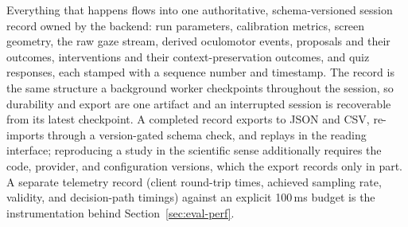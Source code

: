 Everything that happens flows into one authoritative, schema-versioned session record owned by the backend: run parameters, calibration metrics, screen geometry, the raw gaze stream, derived oculomotor events, proposals and their outcomes, interventions and their context-preservation outcomes, and quiz responses, each stamped with a sequence number and timestamp.
The record is the same structure a background worker checkpoints throughout the session, so durability and export are one artifact and an interrupted session is recoverable from its latest checkpoint.
A completed record exports to JSON and CSV, re-imports through a version-gated schema check, and replays in the reading interface; reproducing a study in the scientific sense additionally requires the code, provider, and configuration versions, which the export records only in part.
A separate telemetry record (client round-trip times, achieved sampling rate, validity, and decision-path timings) against an explicit 100\,ms budget is the instrumentation behind Section~\ref{sec:eval-perf}.
